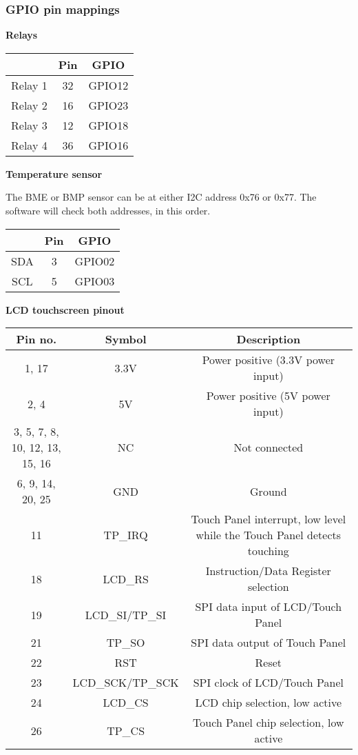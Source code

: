 \subsubsection{GPIO pin mappings}

\textbf{Relays}

\begin{tabular}{|c|c|c|}
\rowcolor{lightgray}
\hline
         & \textbf{Pin} & \textbf{GPIO} \\ 
\hline
 Relay 1 & 32           & GPIO12 \\ 
\hline
 Relay 2 & 16           & GPIO23 \\  
\hline
 Relay 3 & 12           & GPIO18 \\
\hline
 Relay 4 & 36           & GPIO16 \\
\hline
\end{tabular}

\textbf{Temperature sensor}

The BME or BMP sensor can be at either I2C address 0x76 or 0x77. The software
will check both addresses, in this order.

\begin{tabular}{|c|c|c|}
\rowcolor{lightgray}
\hline
     & \textbf{Pin} & \textbf{GPIO} \\ 
\hline
 SDA & 3            & GPIO02 \\ 
\hline
 SCL & 5            & GPIO03 \\ 
\hline
\end{tabular}

\textbf{LCD touchscreen pinout}

\begin{tabular}{|c|c|c|}
\rowcolor{lightgray}
\hline
\textbf{Pin no.} & \textbf{Symbol} & \textbf{Description} \\ 
\hline
1, 17 & 3.3V & Power positive (3.3V power input) \\ 
\hline
2, 4 & 5V & Power positive (5V power input) \\ 
\hline
3, 5, 7, 8, 10, 12, 13, 15, 16 & NC & Not connected \\ 
\hline
6, 9, 14, 20, 25 & GND & Ground \\ 
\hline
11 & TP\_IRQ & Touch Panel interrupt, low level while the Touch Panel detects touching \\ 
\hline
18 & LCD\_RS & Instruction/Data Register selection \\
\hline
19 & LCD\_SI/TP\_SI & SPI data input of LCD/Touch Panel \\
\hline
21 & TP\_SO & SPI data output of Touch Panel \\
\hline
22 & RST & Reset \\
\hline
23 & LCD\_SCK/TP\_SCK & SPI clock of LCD/Touch Panel \\
\hline
24 & LCD\_CS & LCD chip selection, low active \\
\hline
26 & TP\_CS & Touch Panel chip selection, low active \\
\hline
\end{tabular}


